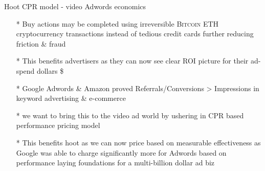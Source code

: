 \documentclass[11pt]{beamer}
\begin{document}
\begin{frame}[t]{Hoot CPR model - video Adwords economics}
\begin{itemize}[<+-| alert@+>]

\item[*]Buy actions may be completed using irreversible  \textsc{Bitcoin ETH} cryptocurrency transactions instead of tedious credit cards further reducing friction \& fraud
\item[*]This benefits advertisers as they can now see clear ROI picture for their ad-spend dollars \$
\item[*]Google Adwords \& Amazon proved Referrals/Conversions > Impressions in keyword advertising \& e-commerce
\item[*]we want to bring this to the video ad world by ushering in CPR based performance pricing model
\item[*]This benefits hoot as we can now price based on measurable effectiveness as Google was able to charge significantly more for Adwords based on performance laying foundations for a multi-billion dollar ad biz

\end{itemize}
\end{frame}
\end{document}
